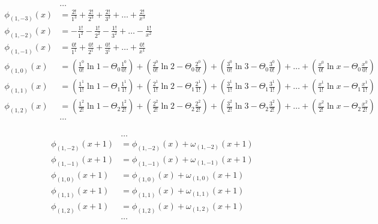 \begin{equation*} \begin{aligned}
&\ldots
\\
\phi_{(1,-3)}(x) &=
  \frac{2!}{1^3}
+ \frac{2!}{2^3} 
+ \frac{2!}{3^3} 
+ \ldots 
+ \frac{2!}{x^3}
\\
\phi_{(1,-2)}(x) &=
- \frac{1!}{1^2}
- \frac{1!}{2^2} 
- \frac{1!}{3^2} 
+ \ldots 
- \frac{1!}{x^2}
\\
\phi_{(1,-1)}(x) &=
  \frac{0!}{1^1}
+ \frac{0!}{2^1} 
+ \frac{0!}{3^1} 
+ \ldots 
+ \frac{0!}{x^1}
\\
\phi_{(1,0)}(x) &=
  \left( \frac{1^0}{0!} \ln{1} - \Theta_0 \frac{1^0}{0!} \right)
+ \left( \frac{2^0}{0!} \ln{2} - \Theta_0 \frac{2^0}{0!} \right) 
+ \left( \frac{3^0}{0!} \ln{3} - \Theta_0 \frac{3^0}{0!} \right) 
+ \ldots 
+ \left( \frac{x^0}{0!} \ln{x} - \Theta_0 \frac{x^0}{0!} \right)
\\
\phi_{(1,1)}(x) &=
  \left(\frac{1^1}{1!} \ln{1} - \Theta_1 \frac{1^1}{1!} \right)
+ \left( \frac{2^1}{1!} \ln{2} - \Theta_1 \frac{2^1}{1!} \right) 
+ \left( \frac{3^1}{1!} \ln{3} - \Theta_1 \frac{3^1}{1!} \right) 
+ \ldots 
+ \left( \frac{x^1}{1!} \ln{x} - \Theta_1 \frac{x^1}{1!} \right)
\\
\phi_{(1,2)}(x) &=
  \left( \frac{1^2}{2!} \ln{1} - \Theta_2 \frac{1^2}{2!} \right)
+ \left( \frac{2^2}{2!} \ln{2} - \Theta_2 \frac{2^2}{2!} \right) 
+ \left( \frac{3^2}{2!} \ln{3} - \Theta_2 \frac{3^2}{2!} \right) 
+ \ldots 
+ \left( \frac{x^2}{2!} \ln{x} - \Theta_2 \frac{x^2}{2!} \right)
\\
&\ldots
\\
\end{aligned} \end{equation*}

\begin{equation*} \begin{aligned}
&\ldots
\\
\phi_{(1,-2)}(x + 1) &= 
  \phi_{(1,-2)}(x) + \omega_{(1,-2)}(x + 1)
\\
\phi_{(1,-1)}(x + 1) &= 
  \phi_{(1,-1)}(x) + \omega_{(1,-1)}(x + 1)  
\\
\phi_{(1,0)}(x + 1) &= 
  \phi_{(1,0)}(x) + \omega_{(1,0)}(x + 1)  
\\
\phi_{(1,1)}(x + 1) &= 
  \phi_{(1,1)}(x) + \omega_{(1,1)}(x + 1)  
\\
\phi_{(1,2)}(x + 1) &= 
  \phi_{(1,2)}(x) + \omega_{(1,2)}(x + 1)  
\\
&\ldots \\
\end{aligned} \end{equation*}

